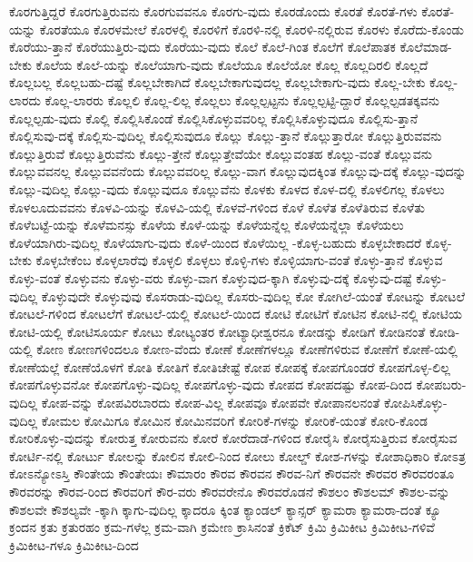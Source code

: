 {ಕೊರಗುತ್ತಿದ್ದರೆ
ಕೊರಗುತ್ತಿರುವನು
ಕೊರಗುವವನೂ
ಕೊರಗು-ವುದು
ಕೊರಡೊಂದು
ಕೊರತೆ
ಕೊರತೆ-ಗಳು
ಕೊರತೆ-ಯನ್ನು
ಕೊರತೆಯೂ
ಕೊರಳಮೇಲೆ
ಕೊರಳಲ್ಲಿ
ಕೊರಳಿಗೆ
ಕೊರಳಿ-ನಲ್ಲಿ
ಕೊರಳಿ-ನಲ್ಲಿರುವ
ಕೊರಳು
ಕೊರೆದು-ಕೊಂಡು
ಕೊರೆಯು-ತ್ತಾನೆ
ಕೊರೆಯುತ್ತಿರು-ವುದು
ಕೊರೆಯು-ವುದು
ಕೊಲೆ
ಕೊಲೆ-ಗಿಂತ
ಕೊಲೆಗೆ
ಕೊಲೆಪಾತಕ
ಕೊಲೆಮಾಡ-ಬೇಕು
ಕೊಲೆಯ
ಕೊಲೆ-ಯನ್ನು
ಕೊಲೆಯಾಗು-ವುದು
ಕೊಲೆಯೂ
ಕೊಲೆಯೋ
ಕೊಲ್ಲ
ಕೊಲ್ಲದಿರಲಿ
ಕೊಲ್ಲದೆ
ಕೊಲ್ಲಬಲ್ಲ
ಕೊಲ್ಲಬಹು-ದಷ್ಟೆ
ಕೊಲ್ಲಬೇಕಾಗಿದೆ
ಕೊಲ್ಲಬೇಕಾಗುವುದಲ್ಲ
ಕೊಲ್ಲಬೇಕಾಗು-ವುದು
ಕೊಲ್ಲ-ಬೇಕು
ಕೊಲ್ಲ-ಲಾರದು
ಕೊಲ್ಲ-ಲಾರರು
ಕೊಲ್ಲಲಿ
ಕೊಲ್ಲ-ಲಿಲ್ಲ
ಕೊಲ್ಲಲು
ಕೊಲ್ಲಲ್ಪಟ್ಟನು
ಕೊಲ್ಲಲ್ಪಟ್ಟಿ-ದ್ದಾರೆ
ಕೊಲ್ಲಲ್ಪಡತಕ್ಕವನು
ಕೊಲ್ಲಲ್ಪಡು-ವುದು
ಕೊಲ್ಲಿ
ಕೊಲ್ಲಿಸಿಕೊಂಡೆ
ಕೊಲ್ಲಿಸಿಕೊಳ್ಳುವವರಿಲ್ಲ
ಕೊಲ್ಲಿಸಿಕೊಳ್ಳುವುದೂ
ಕೊಲ್ಲಿಸು-ತ್ತಾನೆ
ಕೊಲ್ಲಿಸುವು-ದಕ್ಕೆ
ಕೊಲ್ಲಿಸು-ವುದಿಲ್ಲ
ಕೊಲ್ಲಿಸುವುದೂ
ಕೊಲ್ಲು
ಕೊಲ್ಲು-ತ್ತಾನೆ
ಕೊಲ್ಲುತ್ತಾರೋ
ಕೊಲ್ಲುತ್ತಿರುವವನು
ಕೊಲ್ಲುತ್ತಿರುವೆ
ಕೊಲ್ಲುತ್ತಿರುವೆನು
ಕೊಲ್ಲು-ತ್ತೇನೆ
ಕೊಲ್ಲುತ್ತೇವೆಯೇ
ಕೊಲ್ಲುವಂತಹ
ಕೊಲ್ಲು-ವಂತೆ
ಕೊಲ್ಲುವನು
ಕೊಲ್ಲುವವನಲ್ಲ
ಕೊಲ್ಲುವವನೆಂದು
ಕೊಲ್ಲುವವರಿಲ್ಲ
ಕೊಲ್ಲು-ವಾಗ
ಕೊಲ್ಲುವುದಕ್ಕಿಂತ
ಕೊಲ್ಲುವು-ದಕ್ಕೆ
ಕೊಲ್ಲು-ವುದನ್ನು
ಕೊಲ್ಲು-ವುದಿಲ್ಲ
ಕೊಲ್ಲು-ವುದು
ಕೊಲ್ಲುವುದೂ
ಕೊಲ್ಲುವೆನು
ಕೊಳಕು
ಕೊಳದ
ಕೊಳ-ದಲ್ಲಿ
ಕೊಳಲಿಗಲ್ಲ
ಕೊಳಲು
ಕೊಳಲೂದುವವನು
ಕೊಳವಿ-ಯನ್ನು
ಕೊಳವಿ-ಯಲ್ಲಿ
ಕೊಳವೆ-ಗಳಿಂದ
ಕೊಳೆ
ಕೊಳೆತ
ಕೊಳೆತಿರುವ
ಕೊಳೆತು
ಕೊಳೆಬಟ್ಟೆ-ಯನ್ನು
ಕೊಳೆಮನಸ್ಸು
ಕೊಳೆಯ
ಕೊಳೆ-ಯನ್ನು
ಕೊಳೆಯನ್ನೆಲ್ಲ
ಕೊಳೆಯನ್ನೆಲ್ಲಾ
ಕೊಳೆಯಲು
ಕೊಳೆಯಾಗಿರು-ವುದಿಲ್ಲ
ಕೊಳೆಯಾಗು-ವುದು
ಕೊಳೆ-ಯಿಂದ
ಕೊಳೆಯಿಲ್ಲ
-ಕೊಳ್ಳ-ಬಹುದು
ಕೊಳ್ಳಬೇಕಾದರೆ
ಕೊಳ್ಳ-ಬೇಕು
ಕೊಳ್ಳಬೇಕೆಂಬ
ಕೊಳ್ಳಲಾರೆವು
ಕೊಳ್ಳಲಿ
ಕೊಳ್ಳಲು
ಕೊಳ್ಳಿ-ಗಳು
ಕೊಳ್ಳಿಯಾಗು-ವಂತೆ
ಕೊಳ್ಳು-ತ್ತಾನೆ
ಕೊಳ್ಳುವ
ಕೊಳ್ಳು-ವಂತೆ
ಕೊಳ್ಳುವನು
ಕೊಳ್ಳು-ವರು
ಕೊಳ್ಳು-ವಾಗ
ಕೊಳ್ಳುವುದ-ಕ್ಕಾಗಿ
ಕೊಳ್ಳುವು-ದಕ್ಕೆ
ಕೊಳ್ಳುವು-ದಷ್ಟೆ
ಕೊಳ್ಳು-ವುದಿಲ್ಲ
ಕೊಳ್ಳುವುದೇ
ಕೊಳ್ಳುವುವು
ಕೊಸರಾಡು-ವುದಿಲ್ಲ
ಕೊಸರು-ವುದಿಲ್ಲ
ಕೋ
ಕೋಗಿಲೆ-ಯಂತೆ
ಕೋಟನ್ನು
ಕೋಟಲೆ
ಕೋಟಲೆ-ಗಳಿಂದ
ಕೋಟಲೆಗೆ
ಕೋಟಲೆ-ಯಲ್ಲಿ
ಕೋಟಲೆ-ಯಿಂದ
ಕೋಟಿ
ಕೋಟಿಗೆ
ಕೋಟಿನ
ಕೋಟಿ-ನಲ್ಲಿ
ಕೋಟಿಯ
ಕೋಟಿ-ಯಲ್ಲಿ
ಕೋಟಿಸೂರ್ಯ
ಕೋಟು
ಕೋಟ್ಯಂತರ
ಕೋಟ್ಯಾಧೀಶ್ವರನೂ
ಕೋಡನ್ನು
ಕೋಡಿಗೆ
ಕೋಡಿನಂತೆ
ಕೋಡಿ-ಯಲ್ಲಿ
ಕೋಣ
ಕೋಣಗಳಿಂದಲೂ
ಕೋಣ-ವೆಂದು
ಕೋಣೆ
ಕೋಣೆಗಳಲ್ಲೂ
ಕೋಣೆಗಳಿರುವ
ಕೋಣೆಗೆ
ಕೋಣೆ-ಯಲ್ಲಿ
ಕೋಣೆಯಲ್ಲೆ
ಕೋಣೆಯೊಳಗೆ
ಕೋತಿ
ಕೋತಿಗೆ
ಕೋತಿಚೇಷ್ಟೆ
ಕೋಪ
ಕೋಪಕ್ಕೆ
ಕೋಪಗೊಂಡರೆ
ಕೋಪಗೊಳ್ಳ-ಲಿಲ್ಲ
ಕೋಪಗೊಳ್ಳುವನೋ
ಕೋಪಗೊಳ್ಳು-ವುದಿಲ್ಲ
ಕೋಪಗೊಳ್ಳು-ವುದು
ಕೋಪದ
ಕೋಪದಷ್ಟು
ಕೋಪ-ದಿಂದ
ಕೋಪಬರು-ವುದಿಲ್ಲ
ಕೋಪ-ವನ್ನು
ಕೋಪವಿರಬಾರದು
ಕೋಪ-ವಿಲ್ಲ
ಕೋಪವೂ
ಕೋಪವೇ
ಕೋಪಾನಲನಂತೆ
ಕೋಪಿಸಿಕೊಳ್ಳು-ವುದಿಲ್ಲ
ಕೋಮಲ
ಕೋಮಿಗೂ
ಕೋಮಿನ
ಕೋಮಿನವರಿಗೆ
ಕೋರಿಕೆ-ಗಳನ್ನು
ಕೋರಿಕೆ-ಯಂತೆ
ಕೋರಿ-ಕೊಂಡ
ಕೋರಿಕೊಳ್ಳು-ವುದನ್ನು
ಕೋರುತ್ತ
ಕೋರುವನು
ಕೋರೆ
ಕೋರೆದಾಡೆ-ಗಳಿಂದ
ಕೋರೈಸಿ
ಕೋರೈಸುತ್ತಿರುವ
ಕೋರೈಸುವ
ಕೋರ್ಟಿ-ನಲ್ಲಿ
ಕೋರ್ಟು
ಕೋಲನ್ನು
ಕೋಲಿನ
ಕೋಲಿ-ನಿಂದ
ಕೋಲು
ಕೋಲ್ಡ್
ಕೋಶ-ಗಳನ್ನು
ಕೋಶಾಧಿಕಾರಿ
ಕೋಽತ್ರ
ಕೋಽನ್ಯೋಽಸ್ತಿ
ಕೌಂತೇಯ
ಕೌಂತೇಯಃ
ಕೌಮಾರಂ
ಕೌರವ
ಕೌರವನ
ಕೌರವ-ನಿಗೆ
ಕೌರವನೇ
ಕೌರವರ
ಕೌರವರಂತೂ
ಕೌರವರನ್ನು
ಕೌರವ-ರಿಂದ
ಕೌರವರಿಗೆ
ಕೌರ-ವರು
ಕೌರವರೇನೊ
ಕೌರವರೊಡನೆ
ಕೌಶಲಂ
ಕೌಶಲಮ್
ಕೌಶಲ-ವನ್ನು
ಕೌಶಲವೇ
ಕೌಶಲ್ಯವೇ
-ಕ್ಕಾಗಿ
ಕ್ಕಾಗು-ವುದಿಲ್ಲ
ಕ್ಕಾದರೂ
ಕ್ಕಿಂತ
ಕ್ಯಾಂಡಲ್
ಕ್ಯಾನ್ಸರ್
ಕ್ಯಾಮರಾ
ಕ್ಯಾಮರಾ-ದಂತೆ
ಕ್ಯೂ
ಕ್ರಂದನ
ಕ್ರತು
ಕ್ರತುರಹಂ
ಕ್ರಮ-ಗಳೆಲ್ಲ
ಕ್ರಮ-ವಾಗಿ
ಕ್ರಮೇಣ
ಕ್ರಾಸಿನಂತೆ
ಕ್ರಿಕೆಟ್
ಕ್ರಿಮಿ
ಕ್ರಿಮಿಕೀಟ
ಕ್ರಿಮಿಕೀಟ-ಗಳಿವೆ
ಕ್ರಿಮಿಕೀಟ-ಗಳೂ
ಕ್ರಿಮಿಕೀಟ-ದಿಂದ
}
